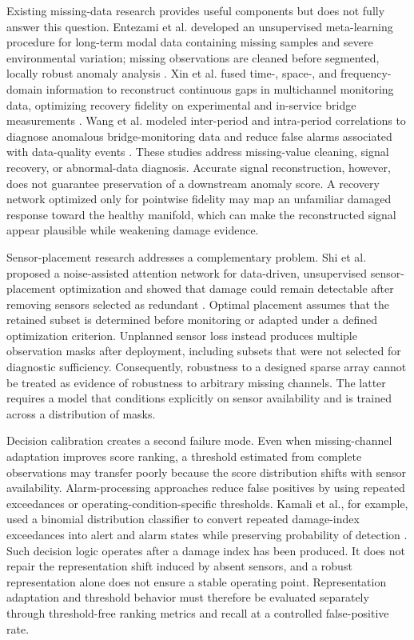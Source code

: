 \documentclass[a4paper,fleqn]{cas-sc}
\begin{document}
Existing missing-data research provides useful components but does not fully answer this question. Entezami et al. developed an unsupervised meta-learning procedure for long-term modal data containing missing samples and severe environmental variation; missing observations are cleaned before segmented, locally robust anomaly analysis \cite{entezami2023meta}. Xin et al. fused time-, space-, and frequency-domain information to reconstruct continuous gaps in multichannel monitoring data, optimizing recovery fidelity on experimental and in-service bridge measurements \cite{xin2025recovery}. Wang et al. modeled inter-period and intra-period correlations to diagnose anomalous bridge-monitoring data and reduce false alarms associated with data-quality events \cite{wang2025online}. These studies address missing-value cleaning, signal recovery, or abnormal-data diagnosis. Accurate signal reconstruction, however, does not guarantee preservation of a downstream anomaly score. A recovery network optimized only for pointwise fidelity may map an unfamiliar damaged response toward the healthy manifold, which can make the reconstructed signal appear plausible while weakening damage evidence.

Sensor-placement research addresses a complementary problem. Shi et al. proposed a noise-assisted attention network for data-driven, unsupervised sensor-placement optimization and showed that damage could remain detectable after removing sensors selected as redundant \cite{shi2024sensor}. Optimal placement assumes that the retained subset is determined before monitoring or adapted under a defined optimization criterion. Unplanned sensor loss instead produces multiple observation masks after deployment, including subsets that were not selected for diagnostic sufficiency. Consequently, robustness to a designed sparse array cannot be treated as evidence of robustness to arbitrary missing channels. The latter requires a model that conditions explicitly on sensor availability and is trained across a distribution of masks.

Decision calibration creates a second failure mode. Even when missing-channel adaptation improves score ranking, a threshold estimated from complete observations may transfer poorly because the score distribution shifts with sensor availability. Alarm-processing approaches reduce false positives by using repeated exceedances or operating-condition-specific thresholds. Kamali et al., for example, used a binomial distribution classifier to convert repeated damage-index exceedances into alert and alarm states while preserving probability of detection \cite{kamali2024reducing}. Such decision logic operates after a damage index has been produced. It does not repair the representation shift induced by absent sensors, and a robust representation alone does not ensure a stable operating point. Representation adaptation and threshold behavior must therefore be evaluated separately through threshold-free ranking metrics and recall at a controlled false-positive rate.
\end{document}
